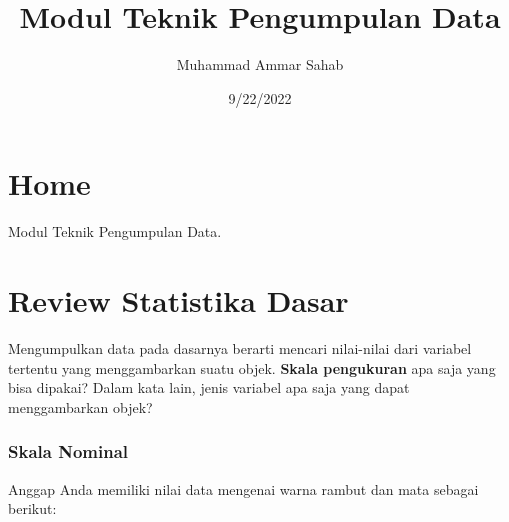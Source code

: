 \documentclass[
  letterpaper,
  DIV=11,
  numbers=noendperiod]{scrreprt}
\title{Modul Teknik Pengumpulan Data}
\author{Muhammad Ammar Sahab}
\date{9/22/2022}
\renewcommand*\contentsname{Table of contents}
\newcommand\contentsname{Table of contents}
\begin{document}
\maketitle
\ifdefined\Shaded\renewenvironment{Shaded}{\begin{tcolorbox}[borderline west={3pt}{0pt}{shadecolor}, enhanced, frame hidden, interior hidden, boxrule=0pt, sharp corners, breakable]}{\end{tcolorbox}}\fi

\renewcommand*\contentsname{Table of contents}
{
\hypersetup{linkcolor=}
\setcounter{tocdepth}{2}
\tableofcontents
}

\hypertarget{home}{%
\chapter*{Home}\label{home}}

Modul Teknik Pengumpulan Data.


\hypertarget{review-statistika-dasar}{%
\chapter{Review Statistika Dasar}\label{review-statistika-dasar}}

Mengumpulkan data pada dasarnya berarti mencari nilai-nilai dari
variabel tertentu yang menggambarkan suatu objek. \textbf{Skala
pengukuran} apa saja yang bisa dipakai? Dalam kata lain, jenis variabel
apa saja yang dapat menggambarkan objek?

\hypertarget{skala-nominal}{%
\subsection{Skala Nominal}\label{skala-nominal}}

Anggap Anda memiliki nilai data mengenai warna rambut dan mata sebagai
berikut:
\end{document}
